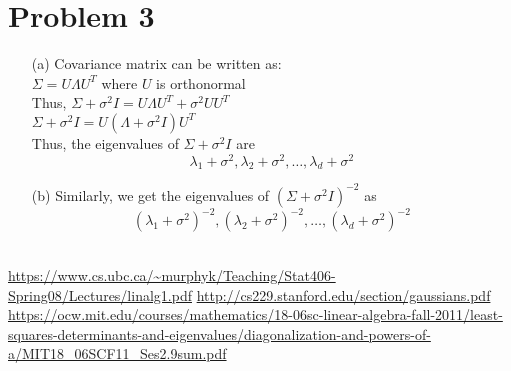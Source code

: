 \documentclass[fleqn]{article}
\begin{document}
\section{Problem 3}{}
\begin{itemize}
        \item[(a)]
                Covariance matrix can be written as:\\
                $\Sigma = U \Lambda U^T$ where $U$ is orthonormal\\
                Thus, $\Sigma + \sigma^2 I = U \Lambda U^T + \sigma^2 U U^T$\\
                $\Sigma + \sigma^2 I = U (\Lambda + \sigma^2 I) U^T$\\
                Thus, the eigenvalues of $\Sigma + \sigma^2I$ are \\
                \[
                \lambda_1 + \sigma^2, \lambda_2 + \sigma^2, \dots, 
                \lambda_d + \sigma^2
                \]
        \item[(b)]
                Similarly, we get the eigenvalues of $(\Sigma + \sigma^2I)^{-2}$
                as \\
                \[
                        (\lambda_1 + \sigma^2)^{-2}, (\lambda_2 + \sigma^2)^{-2}
                        ,\dots, (\lambda_d + \sigma^2)^{-2}
                \]\\
\end{itemize}

\begin{thebibliography}{99}
        \bibitem{[1]} \url{https://www.cs.ubc.ca/~murphyk/Teaching/Stat406-Spring08/Lectures/linalg1.pdf}
        \bibitem{[2]} \url{http://cs229.stanford.edu/section/gaussians.pdf}
        \bibitem{[3]} \url{https://ocw.mit.edu/courses/mathematics/18-06sc-linear-algebra-fall-2011/least-squares-determinants-and-eigenvalues/diagonalization-and-powers-of-a/MIT18_06SCF11_Ses2.9sum.pdf}

\end{thebibliography}
\end{document}
